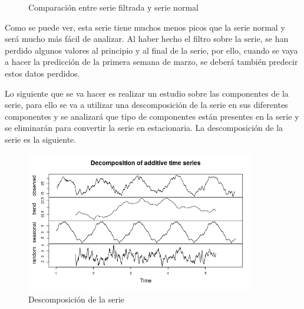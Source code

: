 \begin{figure}[H]
	\centering
	\caption{Comparación entre serie filtrada y serie normal}
	\label{fig:4}
\end{figure}

Como se puede ver, esta serie tiene muchos menos picos que la serie normal y será mucho más fácil de analizar. Al haber hecho el filtro sobre la serie, se han perdido algunos valores al principio y al final de la serie, por ello, cuando se vaya a hacer la predicción de la primera semana de marzo, se deberá también predecir estos datos perdidos.

Lo siguiente que se va hacer es realizar un estudio sobre las componentes de la serie, para ello se va a utilizar una descomposición de la serie en sus diferentes componentes y se analizará que tipo de componentes están presentes en la serie y se eliminarán para convertir la serie en estacionaria. La descomposición de la serie es la siguiente.

\begin{figure}[H]
	\centering
	\includegraphics[width=100mm]{imagenes/decomposition.png}
	\caption{Descomposición de la serie}
	\label{fig:5}
\end{figure}

